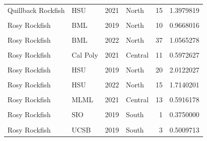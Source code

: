 \documentclass[
]{article}
\begin{document}
\begin{longtable}[t]{llrlrr}
\addlinespace
Quillback Rockfish & HSU & 2021 & North & 15 & 1.3979819\\
\cellcolor{gray!6}{Quillback Rockfish} & \cellcolor{gray!6}{HSU} & \cellcolor{gray!6}{2022} & \cellcolor{gray!6}{North} & \cellcolor{gray!6}{17} & \cellcolor{gray!6}{1.3441257}\\
Rosy Rockfish & BML & 2019 & North & 10 & 0.9668016\\
\cellcolor{gray!6}{Rosy Rockfish} & \cellcolor{gray!6}{BML} & \cellcolor{gray!6}{2021} & \cellcolor{gray!6}{North} & \cellcolor{gray!6}{11} & \cellcolor{gray!6}{1.0178571}\\
Rosy Rockfish & BML & 2022 & North & 37 & 1.0565278\\
\addlinespace
\cellcolor{gray!6}{Rosy Rockfish} & \cellcolor{gray!6}{Cal Poly} & \cellcolor{gray!6}{2019} & \cellcolor{gray!6}{Central} & \cellcolor{gray!6}{7} & \cellcolor{gray!6}{0.4839990}\\
Rosy Rockfish & Cal Poly & 2021 & Central & 11 & 0.5972627\\
\cellcolor{gray!6}{Rosy Rockfish} & \cellcolor{gray!6}{Cal Poly} & \cellcolor{gray!6}{2022} & \cellcolor{gray!6}{Central} & \cellcolor{gray!6}{12} & \cellcolor{gray!6}{2.0253085}\\
Rosy Rockfish & HSU & 2019 & North & 20 & 2.0122027\\
\cellcolor{gray!6}{Rosy Rockfish} & \cellcolor{gray!6}{HSU} & \cellcolor{gray!6}{2021} & \cellcolor{gray!6}{North} & \cellcolor{gray!6}{41} & \cellcolor{gray!6}{3.0224613}\\
\addlinespace
Rosy Rockfish & HSU & 2022 & North & 15 & 1.7140201\\
\cellcolor{gray!6}{Rosy Rockfish} & \cellcolor{gray!6}{MLML} & \cellcolor{gray!6}{2019} & \cellcolor{gray!6}{Central} & \cellcolor{gray!6}{21} & \cellcolor{gray!6}{0.5691056}\\
Rosy Rockfish & MLML & 2021 & Central & 13 & 0.5916178\\
\cellcolor{gray!6}{Rosy Rockfish} & \cellcolor{gray!6}{MLML} & \cellcolor{gray!6}{2022} & \cellcolor{gray!6}{Central} & \cellcolor{gray!6}{29} & \cellcolor{gray!6}{0.8552011}\\
Rosy Rockfish & SIO & 2019 & South & 1 & 0.3750000\\
\addlinespace
\cellcolor{gray!6}{Rosy Rockfish} & \cellcolor{gray!6}{SIO} & \cellcolor{gray!6}{2022} & \cellcolor{gray!6}{South} & \cellcolor{gray!6}{12} & \cellcolor{gray!6}{0.4886621}\\
Rosy Rockfish & UCSB & 2019 & South & 3 & 0.5009713\\

\end{longtable}
\end{document}
